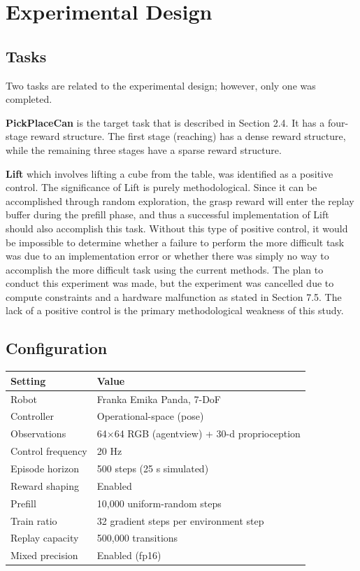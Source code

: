 \documentclass[12pt,a4paper,oneside]{report}
\begin{document}
\newpage

\hypertarget{experimental-design}{%
\chapter{Experimental Design}\label{experimental-design}}

\hypertarget{tasks}{%
\section{Tasks}\label{tasks}}

Two tasks are related to the experimental design; however, only one was completed.

\textbf{PickPlaceCan} is the target task that is described in Section 2.4. It has a four-stage reward structure. The first stage (reaching) has a dense reward structure, while the remaining three stages have a sparse reward structure.

\textbf{Lift} which involves lifting a cube from the table, was identified as a positive control. The significance of Lift is purely methodological. Since it can be accomplished through random exploration, the grasp reward will enter the replay buffer during the prefill phase, and thus a successful implementation of Lift should also accomplish this task. Without this type of positive control, it would be impossible to determine whether a failure to perform the more difficult task was due to an implementation error or whether there was simply no way to accomplish the more difficult task using the current methods. The plan to conduct this experiment was made, but the experiment was cancelled due to compute constraints and a hardware malfunction as stated in Section 7.5. The lack of a positive control is the primary methodological weakness of this study.

\hypertarget{configuration}{%
\section{Configuration}\label{configuration}}

\begin{longtable}[]{@{}ll@{}}
\toprule\noalign{}
Setting & Value \\
\midrule\noalign{}
\endhead
\bottomrule\noalign{}
\endlastfoot
Robot & Franka Emika Panda, 7-DoF \\
Controller & Operational-space (pose) \\
Observations & 64$\times$64 RGB (agentview) + 30-d proprioception \\
Control frequency & 20 Hz \\
Episode horizon & 500 steps (25 s simulated) \\
Reward shaping & Enabled \\
Prefill & 10,000 uniform-random steps \\
Train ratio & 32 gradient steps per environment step \\
Replay capacity & 500,000 transitions \\
Mixed precision & Enabled (fp16) \\
\end{longtable}
\end{document}
